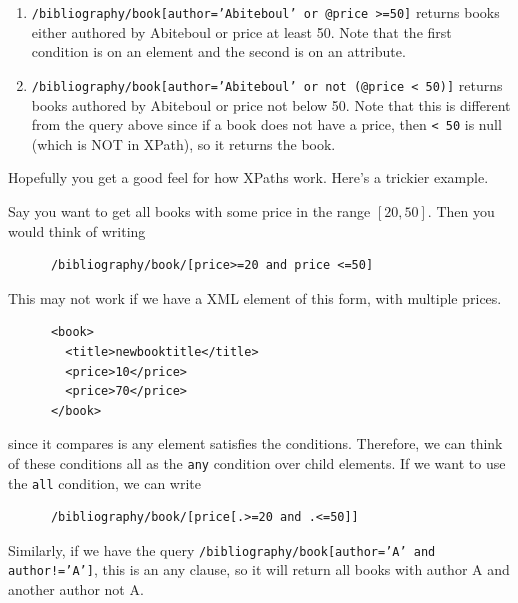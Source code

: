 \begin{example}
\begin{enumerate}
      \item \texttt{/bibliography/book[author='Abiteboul' or @price >=50]} returns books either authored by Abiteboul or price at least 50. Note that the first condition is on an element and the second is on an attribute. 

      \item \texttt{/bibliography/book[author='Abiteboul' or not (@price < 50)]} returns books authored by Abiteboul or price not below 50. Note that this is different from the query above since if a book does not have a price, then \texttt{\@price < 50} is null (which is NOT in XPath), so it returns the book. 
    \end{enumerate}
  \end{example}

  Hopefully you get a good feel for how XPaths work. Here's a trickier example. 

  \begin{example}
    \label{ex:conditions-on-any-vs-all-attributes-elements}
    Say you want to get all books with some price in the range $[20, 50]$. Then you would think of writing 
    \begin{lstlisting}
      /bibliography/book/[price>=20 and price <=50]
    \end{lstlisting}
    This may not work if we have a XML element of this form, with multiple prices. 
    \begin{lstlisting}
      <book> 
        <title>newbooktitle</title>
        <price>10</price>
        <price>70</price> 
      </book>
    \end{lstlisting} 
    since it compares is any element satisfies the conditions. Therefore, we can think of these conditions all as the \texttt{any} condition over child elements. If we want to use the \texttt{all} condition, we can write 
    \begin{lstlisting}
      /bibliography/book/[price[.>=20 and .<=50]]
    \end{lstlisting}

    Similarly, if we have the query \texttt{/bibliography/book[author='A' and author!='A']}, this is an any clause, so it will return all books with author A and another author not A. 
  \end{example}

